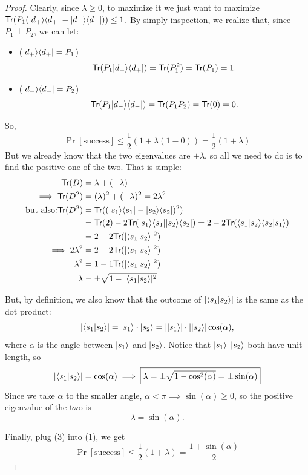 \documentclass[12pt]{article}
\begin{document}
\begin{proof}
\noindent Clearly, since $\lambda\geq 0$, to maximize it we just want to maximize $\Trace{P_1 (\kb{d_+}{d_+} - \kb{d_-}{d_-})}\leq 1$. By simply inspection, we realize that, since $P_1\perp P_2$, we can let:
\begin{itemize}
    \item ($\kb{d_+}{d_+} = P_1$) $$
    \Trace{P_1\kb{d_+}{d_+}} = \Trace{P_1^2} = \Trace{P_1} = 1.
    $$
    \item ($\kb{d_-}{d_-} = P_2$) $$
    \Trace{P_1\kb{d_-}{d_-}} = \Trace{P_1P_2} = \Trace{0} = 0.
    $$
\end{itemize}

\noindent So, \begin{equation}
\Pr[\text{success}] \leq \frac{1}{2}(1+\lambda(1-0)) = \frac{1}{2}(1+\lambda)
\end{equation}
But we already know that the two eigenvalues are $\pm \lambda$, so all we need to do is to find the positive one of the two. That is simple: $$
\begin{aligned}
\Trace{D}
    &= \lambda + (- \lambda)\\
\implies
\Trace{D^2}
    &= (\lambda)^2 + (-\lambda)^2 = 2\lambda^2\\
\text{but also:}
\Trace{D^2}
    &= \Trace{(\kb{s_1}{s_1} - \kb{s_2}{s_2})^2}\\
    &= \Trace{ 2 } - 2\Trace{ \kb{s_1}{s_1}\kb{s_2}{s_2} } = 2- 2\Trace{\bk{s_1}{s_2}\bk{s_2}{s_1}}\\
    &= 2- 2\Trace{|\bk{s_1}{s_2}|^2}\\
\implies
2\lambda^2
    &= 2- 2\Trace{|\bk{s_1}{s_2}|^2}\\
\lambda^2
    &= 1- 1\Trace{|\bk{s_1}{s_2}|^2}\\
\lambda
    &= \pm\sqrt{1 - |\bk{s_1}{s_2}|^2}
\end{aligned}
$$

\noindent But, by definition, we also know that the outcome of $|\bk{s_1}{s_2}|$ is the same as the dot product: $$
|\bk{s_1}{s_2}| = \Ket{s_1}\cdot \Ket{s_2} = |\Ket{s_1}|\cdot |\Ket{s_2}|\cos(\alpha),
$$ where $\alpha$ is the angle between $\Ket{s_1}$ and $\Ket{s_2}$. Notice that $\Ket{s_1}$ $\Ket{s_2}$ both have unit length, so \begin{equation}
|\bk{s_1}{s_2}| = \cos(\alpha) \implies \boxed{\lambda = \pm\sqrt{1-\cos^2(\alpha)} = \pm\sin(\alpha)}
\end{equation}
Since we take $\alpha$ to the smaller angle, $\alpha < \pi\implies \sin(\alpha)\geq 0$, so the positive eigenvalue of the two is \begin{equation}
\lambda = \sin(\alpha).
\end{equation}

\noindent Finally, plug (3) into (1), we get $$
\boxed{\Pr[\text{success}] \leq \frac{1}{2}(1+\lambda) = \frac{1+\sin(\alpha)}{2}}
$$
\end{proof}
\end{document}

